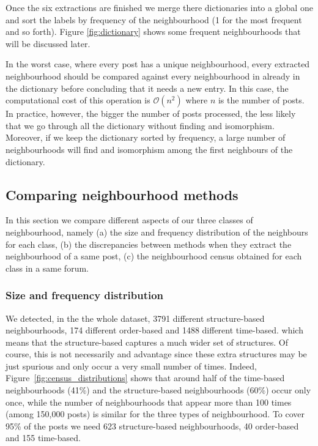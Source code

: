 \documentclass[conference]{IEEEtran}
\begin{document}
Once the six extractions are finished we merge there dictionaries into a global one and sort the labels by frequency of the neighbourhood (1 for the most frequent and so forth). Figure \ref{fig:dictionary} shows some frequent neighbourhoods that will be discussed later.

In the worst case, where every post has a unique neighbourhood, every extracted neighbourhood should be compared against every neighbourhood in already in the dictionary before concluding that it needs a new entry. In this case, the computational cost of this operation is $\mathcal{O}(n^2)$ where $n$ is the number of posts. In practice, however, the bigger the number of posts processed, the less likely that we go through all the dictionary without finding and isomorphism. Moreover, if we keep the dictionary sorted by frequency, a large number of neighbourhoods will find and isomorphism among the first neighbours of the dictionary. 

\subsection{Comparing neighbourhood methods}
In this section we compare different aspects of our three classes of neighbourhood, namely (a) the size and frequency distribution of the neighbours for each class, (b) the discrepancies between methods when they extract the neighbourhood of a same post, (c) the neighbourhood census obtained for each class in a same forum. 

\subsubsection{Size and frequency distribution}
We detected, in the the whole dataset, 3791 different structure-based neighbourhoods, 174 different order-based and 1488 different time-based. which means that the structure-based captures a much wider set of structures. Of course, this is not necessarily and advantage since these extra structures may be just spurious and only occur a very small number of times. Indeed, Figure~\ref{fig:census_distributions} shows that around half of the time-based neighbourhoods (41\%) and the structure-based neighbourhoods (60\%) occur only once, while the number of neighbourhoods that appear more than 100 times (among 150,000 posts) is similar for the three  types of neighbourhood. To cover 95\% of the posts we need 623 structure-based neighbourhoods, 40 order-based and 155 time-based. 
 
\end{document}
